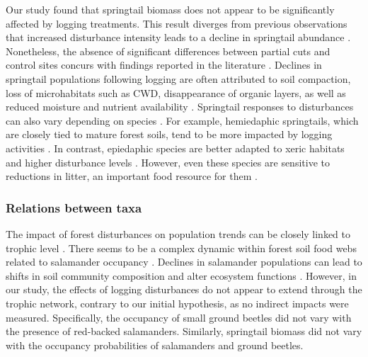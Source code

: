 
Our study found that springtail biomass does not appear to be significantly affected by logging treatments. 
This result diverges from previous observations that increased disturbance intensity leads to a decline in springtail abundance \citep{Lindo2004Forestfloor,Laigle2021Directindirect,Kudrin2023metaanalysiseffects}. 
Nonetheless, the absence of significant differences between partial cuts and control sites concurs with findings reported in the literature \citep{Kudrin2023metaanalysiseffects}. 
Declines in springtail populations following logging are often attributed to soil compaction, loss of microhabitats such as CWD, 
disappearance of organic layers, as well as reduced moisture and nutrient availability \citep{Bird1986Effectwholetree,Baath1995Microbialcommunity,Lindo2004Forestfloor,rousseauForestFloorMesofauna2018}. 
Springtail responses to disturbances can also vary depending on species \citep{raymond-leonardSpringtailCommunityStructure2018a}. 
For example, hemiedaphic springtails, which are closely tied to mature forest soils, tend to be more impacted by logging activities \citep{Laigle2021Directindirect}. 
In contrast, epiedaphic species are better adapted to xeric habitats and higher disturbance levels \citep{Makkonen2011Traitsexplain,rousseauWoodyBiomassRemoval2019}. 
However, even these species are sensitive to reductions in litter, an important food resource for them \citep{rousseauForestFloorMesofauna2018}. 



\subsubsection*{Relations between taxa}
\label{disc:relations_between_taxa}

The impact of forest disturbances on population trends can be closely linked to trophic level \citep{Gotelli2006FoodWebModels,Nolte2019Habitatspecialization}. 
There seems to be a complex dynamic within forest soil food webs related to salamander occupancy \citep{baileyEstimatingSiteOccupancy2004,Walton2006Salamandersforestfloor,Rooney2000impactsalamander}. 
Declines in salamander populations can lead to shifts in soil community composition and alter ecosystem functions \citep{Hairston1987evolutioncompeting,Wyman1998Experimentalassessment,Rooney2000impactsalamander,Walton2005Contrastingeffects}. 
However, in our study, the effects of logging disturbances do not appear to extend through the trophic network, contrary to our initial hypothesis, as no indirect impacts were measured.
Specifically, the occupancy of small ground beetles did not vary with the presence of red-backed salamanders. 
Similarly, springtail biomass did not vary with the occupancy probabilities of salamanders and ground beetles. 


